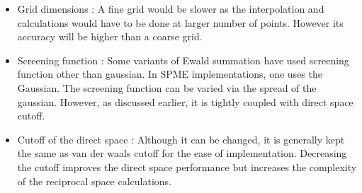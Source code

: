 \documentclass[9pt,bestpractices]{livecoms}
\begin{document}
\begin{itemize}
\item Grid dimensions : A fine grid would be slower as the interpolation and calculations would have to be done at larger number of points. However its accuracy will be higher than a coarse grid.
\item Screening function : Some variants of Ewald summation have used screening function other than  gaussian. In SPME implementations, one uses the Gaussian. The screening function can be varied via the spread of the gaussian.  However, as discussed earlier, it is tightly coupled with direct space cutoff.
\item Cutoff of the direct space : Although it can be changed, it is generally kept the same as van der waals cutoff for the ease of implementation. Decreasing the cutoff improves the direct space performance but increases the complexity of the reciprocal space calculations. 
\end{itemize}


\end{document}
